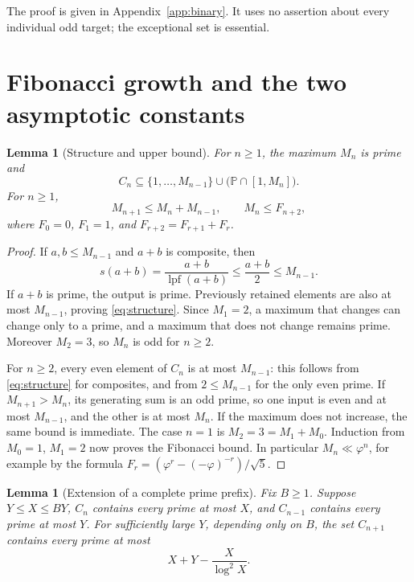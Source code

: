\documentclass[11pt,letterpaper]{article}
\numberwithin{equation}{section}
\newtheorem{lemma}[theorem]{Lemma}
\theoremstyle{remark}
\DeclareMathOperator{\lpf}{lpf}
\newcommand{\Pp}{\mathbb P}
\newcommand{\ph}{\varphi}
\begin{document}
The proof is given in Appendix~\ref{app:binary}. It uses no assertion
about every individual odd target; the exceptional set is essential.

\section{Fibonacci growth and the two asymptotic constants}

\begin{lemma}[Structure and upper bound]\label{lem:structure}
For $n\ge1$, the maximum $M_n$ is prime and
\begin{equation}\label{eq:structure}
 C_n\subseteq\{1,\ldots,M_{n-1}\}
       \cup\bigl(\Pp\cap[1,M_n]\bigr).
\end{equation}
For $n\ge1$,
\begin{equation}\label{eq:fib-upper}
 M_{n+1}\le M_n+M_{n-1},\qquad M_n\le F_{n+2},
\end{equation}
where $F_0=0$, $F_1=1$, and $F_{r+2}=F_{r+1}+F_r$.
\end{lemma}

\begin{proof}
If $a,b\le M_{n-1}$ and $a+b$ is composite, then
\[
 s(a+b)=\frac{a+b}{\lpf(a+b)}\le\frac{a+b}{2}\le M_{n-1}.
\]
If $a+b$ is prime, the output is prime. Previously retained elements
are also at most $M_{n-1}$, proving \eqref{eq:structure}. Since
$M_1=2$, a maximum that changes can change only to a prime, and a
maximum that does not change remains prime. Moreover $M_2=3$, so
$M_n$ is odd for $n\ge2$.

For $n\ge2$, every even element of $C_n$ is at most $M_{n-1}$:
this follows from \eqref{eq:structure} for composites, and from
$2\le M_{n-1}$ for the only even prime. If $M_{n+1}>M_n$, its
generating sum is an odd prime, so one input is even and at most
$M_{n-1}$, and the other is at most $M_n$. If the maximum does not
increase, the same bound is immediate. The case $n=1$ is
$M_2=3=M_1+M_0$. Induction from $M_0=1$, $M_1=2$ now proves
the Fibonacci bound. In particular $M_n\ll\ph^n$, for example by
the formula $F_r=(\ph^r-(-\ph)^{-r})/\sqrt5$.
\end{proof}

\begin{lemma}[Extension of a complete prime prefix]\label{lem:extension}
Fix $B\ge1$. Suppose $Y\le X\le BY$, $C_n$ contains every prime
at most $X$, and $C_{n-1}$ contains every prime at most $Y$.
For sufficiently large $Y$, depending only on $B$, the set $C_{n+1}$
contains every prime at most
\begin{equation}\label{eq:extension}
 X+Y-\frac{X}{\log^2X}.
\end{equation}
\end{lemma}
\end{document}
